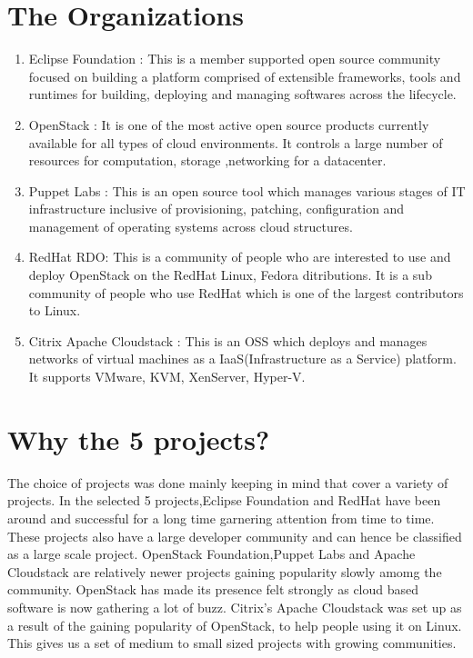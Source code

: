 \documentclass[seploa]{beavtex}
\begin{document}
\section{The Organizations}
\begin{enumerate}
\item Eclipse Foundation :
This is a member supported open source community focused on building a platform comprised of extensible frameworks, tools and runtimes for building, deploying and managing softwares across the lifecycle\cite{eclipse}.
\item OpenStack :
It is one of the most active open source products currently available for all types of cloud environments. It controls a large number of resources for computation, storage ,networking for a datacenter\cite{openstack}.
\item Puppet Labs :
This is an open source tool which manages various stages of IT infrastructure inclusive of provisioning, patching, configuration and management of operating systems across cloud structures\cite{puppet}.
\item RedHat RDO:
This is a community of people who are interested to use and deploy OpenStack on the RedHat Linux, Fedora ditributions. It is a sub community of people who use RedHat which is one of the largest contributors to Linux\cite{rdo}.
\item Citrix Apache Cloudstack :
This is an OSS which deploys and manages networks of virtual machines as a IaaS(Infrastructure as a Service) platform. It supports VMware, KVM, XenServer, Hyper-V\cite{apache}.
\end{enumerate}

\section{Why the 5 projects?}
The choice of projects was done mainly keeping in mind that cover a variety of projects. In the selected 5 projects,Eclipse Foundation and RedHat have been around and successful for a long time garnering attention from time to time. These projects also have a large developer community and can hence be classified as a large scale project. OpenStack Foundation,Puppet Labs and Apache Cloudstack are relatively newer projects gaining popularity slowly amomg the community. OpenStack has made its presence felt strongly as cloud based software is now gathering a lot of buzz. Citrix's Apache Cloudstack was set up as a result of the gaining popularity of OpenStack, to help people using it on Linux. This gives us a set of medium to small sized projects with growing communities.
\end{document}
